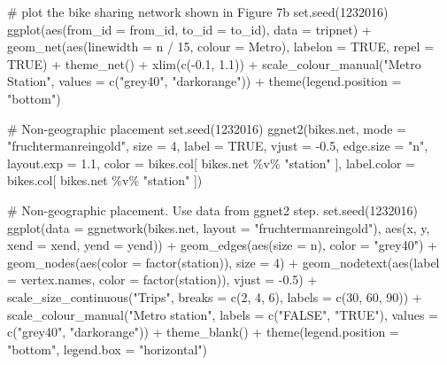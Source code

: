 \begin{example}
# plot the bike sharing network shown in Figure 7b
set.seed(1232016)
ggplot(aes(from_id = from_id, to_id = to_id), data = tripnet) +
  geom_net(aes(linewidth = n / 15, colour = Metro),
           labelon = TRUE, repel = TRUE) +
  theme_net() +
  xlim(c(-0.1, 1.1)) +
  scale_colour_manual("Metro Station", values = c("grey40", "darkorange")) +
  theme(legend.position = "bottom")


\end{example}

  
\begin{example}
# Non-geographic placement
set.seed(1232016)
ggnet2(bikes.net, mode = "fruchtermanreingold", size = 4, label = TRUE,
       vjust = -0.5, edge.size = "n", layout.exp = 1.1,
       color = bikes.col[ bikes.net \%v\% "station" ],
       label.color = bikes.col[ bikes.net \%v\% "station" ])


\end{example}
  
\begin{example}
# Non-geographic placement. Use data from ggnet2 step.
set.seed(1232016)
ggplot(data = ggnetwork(bikes.net, layout = "fruchtermanreingold"),
         aes(x, y, xend = xend, yend = yend)) +
  geom_edges(aes(size = n), color = "grey40") +
  geom_nodes(aes(color = factor(station)), size = 4) +
  geom_nodetext(aes(label = vertex.names, color = factor(station)),
                vjust = -0.5) +
  scale_size_continuous("Trips", breaks = c(2, 4, 6), labels = c(30, 60, 90)) +
  scale_colour_manual("Metro station", labels = c("FALSE", "TRUE"),
                      values = c("grey40", "darkorange")) +
  theme_blank() +
  theme(legend.position = "bottom", legend.box = "horizontal")


\end{example}
  


